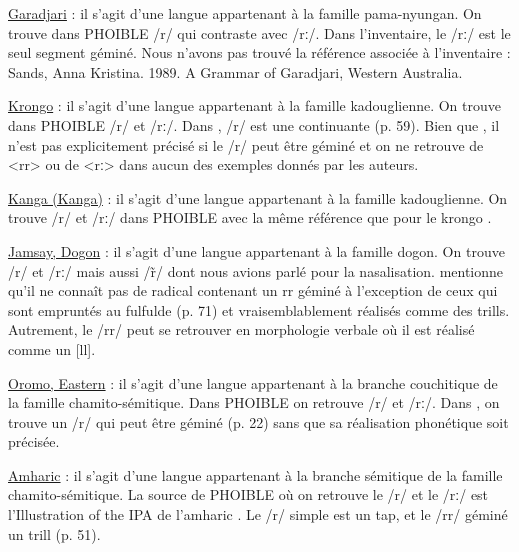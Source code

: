 \begin{exe}
	\ex \begin{xlist}

	\ex \href{https://phoible.org/inventories/view/879}{Garadjari}  : il s'agit d'une langue appartenant à la famille pama-nyungan. On trouve dans PHOIBLE /r/ qui contraste avec /rː/. Dans l'inventaire, le /rː/ est le seul segment géminé. Nous n'avons pas trouvé la référence associée à l'inventaire :  Sands, Anna Kristina. 1989. A Grammar of Garadjari, Western Australia.
	
	\ex \href{https://phoible.org/inventories/view/1418}{Krongo}  : il s'agit d'une langue appartenant à la famille kadouglienne. On trouve dans PHOIBLE /r/ et /rː/. Dans \textcite{hallKadugliKrongo2004}, /r/ est une continuante (p. 59). Bien que , il n'est pas explicitement précisé si le /r/ peut être géminé et on ne retrouve de <rr> ou de <rː> dans aucun des exemples donnés par les auteurs.
	
	\ex \href{https://phoible.org/inventories/view/1419}{Kanga (Kanga)}  : il s'agit d'une langue appartenant à la famille kadouglienne. On trouve /r/ et /rː/ dans PHOIBLE avec la même référence que pour le krongo \parencite{hallKadugliKrongo2004}.
	
	\ex \href{https://phoible.org/inventories/view/1442}{Jamsay, Dogon}  : il s'agit d'une langue appartenant à la famille dogon. On trouve /r/ et /rː/ mais aussi /r̃/ dont nous avions parlé pour la nasalisation. \textcite{heathGrammarJamsay2008} mentionne qu'il ne connaît pas de radical contenant un rr géminé à l'exception de ceux qui sont empruntés au fulfulde (p. 71) et vraisemblablement réalisés comme des trills. Autrement, le /rr/ peut se retrouver en morphologie verbale où il est réalisé comme un [ll].
	
	\ex \href{https://phoible.org/inventories/view/1552}{Oromo, Eastern}  : il s'agit d'une langue appartenant à la branche couchitique de la famille chamito-sémitique. Dans PHOIBLE on retrouve /r/ et /rː/. Dans \textcite{owensGrammarHararOromo1985}, on trouve un /r/ qui peut être géminé (p. 22) sans que sa réalisation phonétique soit précisée.
	
	\ex \href{https://phoible.org/inventories/view/2156}{Amharic}  : il s'agit d'une langue appartenant à la branche sémitique de la famille chamito-sémitique. La source de PHOIBLE où on retrouve le /r/ et le /rː/ est l'Illustration of the IPA de l'amharic \parencite{haywardAmharic1992}. Le /r/ simple est un tap, et le /rr/ géminé un trill (p. 51).
	\end{xlist}

\end{exe}

